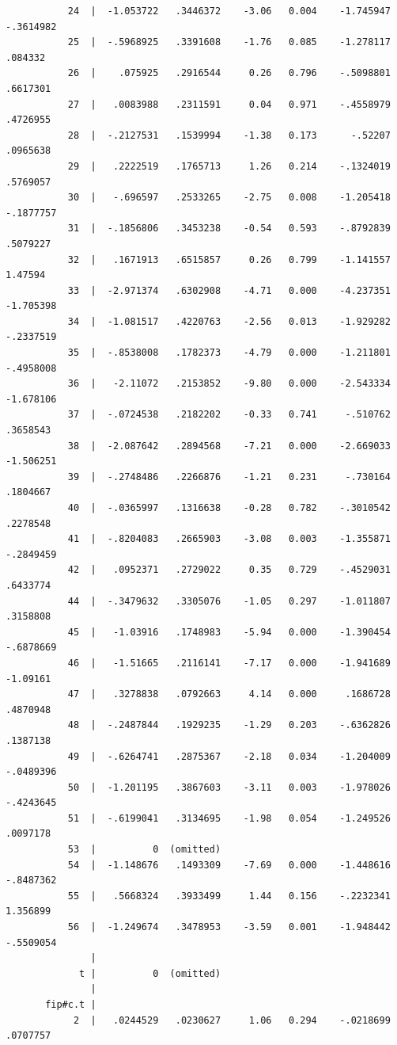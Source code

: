 \documentclass[
]{book}
\begin{document}
\begin{verbatim}
           24  |  -1.053722   .3446372    -3.06   0.004    -1.745947   -.3614982
           25  |  -.5968925   .3391608    -1.76   0.085    -1.278117     .084332
           26  |    .075925   .2916544     0.26   0.796    -.5098801    .6617301
           27  |   .0083988   .2311591     0.04   0.971    -.4558979    .4726955
           28  |  -.2127531   .1539994    -1.38   0.173      -.52207    .0965638
           29  |   .2222519   .1765713     1.26   0.214    -.1324019    .5769057
           30  |   -.696597   .2533265    -2.75   0.008    -1.205418   -.1877757
           31  |  -.1856806   .3453238    -0.54   0.593    -.8792839    .5079227
           32  |   .1671913   .6515857     0.26   0.799    -1.141557     1.47594
           33  |  -2.971374   .6302908    -4.71   0.000    -4.237351   -1.705398
           34  |  -1.081517   .4220763    -2.56   0.013    -1.929282   -.2337519
           35  |  -.8538008   .1782373    -4.79   0.000    -1.211801   -.4958008
           36  |   -2.11072   .2153852    -9.80   0.000    -2.543334   -1.678106
           37  |  -.0724538   .2182202    -0.33   0.741     -.510762    .3658543
           38  |  -2.087642   .2894568    -7.21   0.000    -2.669033   -1.506251
           39  |  -.2748486   .2266876    -1.21   0.231     -.730164    .1804667
           40  |  -.0365997   .1316638    -0.28   0.782    -.3010542    .2278548
           41  |  -.8204083   .2665903    -3.08   0.003    -1.355871   -.2849459
           42  |   .0952371   .2729022     0.35   0.729    -.4529031    .6433774
           44  |  -.3479632   .3305076    -1.05   0.297    -1.011807    .3158808
           45  |   -1.03916   .1748983    -5.94   0.000    -1.390454   -.6878669
           46  |   -1.51665   .2116141    -7.17   0.000    -1.941689    -1.09161
           47  |   .3278838   .0792663     4.14   0.000     .1686728    .4870948
           48  |  -.2487844   .1929235    -1.29   0.203    -.6362826    .1387138
           49  |  -.6264741   .2875367    -2.18   0.034    -1.204009   -.0489396
           50  |  -1.201195   .3867603    -3.11   0.003    -1.978026   -.4243645
           51  |  -.6199041   .3134695    -1.98   0.054    -1.249526    .0097178
           53  |          0  (omitted)
           54  |  -1.148676   .1493309    -7.69   0.000    -1.448616   -.8487362
           55  |   .5668324   .3933499     1.44   0.156    -.2232341    1.356899
           56  |  -1.249674   .3478953    -3.59   0.001    -1.948442   -.5509054
               |
             t |          0  (omitted)
               |
       fip#c.t |
            2  |   .0244529   .0230627     1.06   0.294    -.0218699    .0707757

\end{verbatim}
\end{document}
